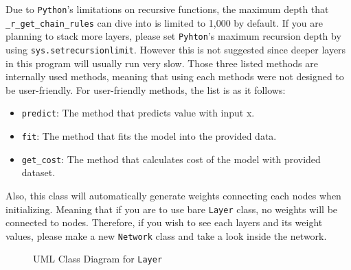 \documentclass{homework}
\begin{document}
Due to \texttt{Python}'s limitations on recursive functions, the maximum depth that \texttt{_r_get_chain_rules} can dive into is limited to 1,000 by default. If you are planning to stack more layers, please set  \texttt{Pyhton}'s maximum recursion depth by using \texttt{sys.setrecursionlimit}. However this is not suggested since deeper layers in this program will usually run very slow. Those three listed methods are internally used methods, meaning that using each methods were not designed to be user-friendly. For user-friendly methods, the list is as it follows:
\begin{itemize}
    \item \texttt{predict}: The method that predicts value with input x. 
    \item \texttt{fit}: The method that fits the model into the provided data. 
    \item \texttt{get_cost}: The method that calculates cost of the model with provided dataset.
\end{itemize}

Also, this class will automatically generate weights connecting each nodes when initializing. Meaning that if you are to use bare \texttt{Layer} class, no weights will be connected to nodes. Therefore, if you wish to see each layers and its weight values, please make a new \texttt{Network} class and take a look inside the network.

\begin{figure}[h]
\centering
    \caption{UML Class Diagram for \texttt{Layer}}
\end{figure}
\end{document}
